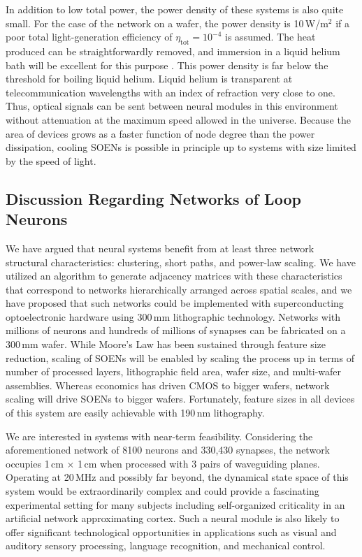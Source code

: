 \documentclass[twocolumn]{article}
\begin{document}
In addition to low total power, the power density of these systems is also quite small. For the case of the network on a wafer, the power density is 10\,W/m$^2$ if a poor total light-generation efficiency of $\eta_{\mathrm{tot}} = 10^{-4}$ is assumed. The heat produced can be straightforwardly removed, and immersion in a liquid helium bath will be excellent for this purpose \cite{ek2006}. This power density is far below the threshold for boiling liquid helium. Liquid helium is transparent at telecommunication wavelengths with an index of refraction very close to one. Thus, optical signals can be sent between neural modules in this environment without attenuation at the maximum speed allowed in the universe. Because the area of devices grows as a faster function of node degree than the power dissipation, cooling SOENs is possible in principle up to systems with size limited by the speed of light.

\subsection{\label{sec:discussion_networks}Discussion Regarding Networks of Loop Neurons}
We have argued that neural systems benefit from at least three network structural characteristics: clustering, short paths, and power-law scaling. We have utilized an algorithm to generate adjacency matrices with these characteristics that correspond to networks hierarchically arranged across spatial scales, and we have proposed that such networks could be implemented with superconducting optoelectronic hardware using 300\,mm lithographic technology. Networks with millions of neurons and hundreds of millions of synapses can be fabricated on a 300\,mm wafer. While Moore's Law has been sustained through feature size reduction, scaling of SOENs will be enabled by scaling the process up in terms of number of processed layers, lithographic field area, wafer size, and multi-wafer assemblies. Whereas economics has driven CMOS to bigger wafers, network scaling will drive SOENs to bigger wafers. Fortunately, feature sizes in all devices of this system are easily achievable with 190\,nm lithography.

We are interested in systems with near-term feasibility. Considering the aforementioned network of 8100 neurons and 330,430 synapses, the network occupies 1\,cm $\times$ 1\,cm when processed with 3 pairs of waveguiding planes. Operating at 20\,MHz and possibly far beyond, the dynamical state space of this system would be extraordinarily complex and could provide a fascinating experimental setting for many subjects including self-organized criticality \cite{be2007,kism2009,shya2009,ch2010,rusp2011} in an artificial network approximating cortex. Such a neural module is also likely to offer significant technological opportunities in applications such as visual and auditory sensory processing, language recognition, and mechanical control.  
\end{document}
